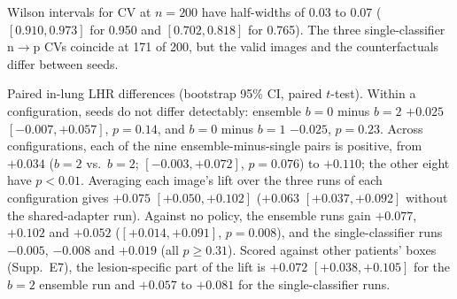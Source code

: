 \begin{table}[h]
\centering
\caption{PPO seed replicates on the default's 400 test images. CV with Wilson 95\% CI; transfer is the mean $\rho_v$ over the three validators; in-lung LHR with $t$-interval on the 148 annotated images. $^{\dagger}$LoRA also retrained (seed 1), one adapter for both directions; resumed training (Supp.~E5).}
\label{tab:suppl-seeds}
\scriptsize
\setlength{\tabcolsep}{2.2pt}
\end{table}

Wilson intervals for CV at $n=200$ have half-widths of 0.03 to 0.07 (\eg $[0.910, 0.973]$ for 0.950 and $[0.702, 0.818]$ for 0.765). The three single-classifier n$\to$p CVs coincide at 171 of 200, but the valid images and the counterfactuals differ between seeds.

Paired in-lung LHR differences (bootstrap 95\% CI, paired $t$-test). Within a configuration, seeds do not differ detectably: ensemble $b=0$ minus $b=2$ $+0.025$ $[-0.007, +0.057]$, $p=0.14$, and $b=0$ minus $b=1$ $-0.025$, $p=0.23$. Across configurations, each of the nine ensemble-minus-single pairs is positive, from $+0.034$ ($b=2$ vs.\ $b=2$; $[-0.003, +0.072]$, $p=0.076$) to $+0.110$; the other eight have $p<0.01$. Averaging each image's lift over the three runs of each configuration gives $+0.075$ $[+0.050, +0.102]$ ($+0.063$ $[+0.037, +0.092]$ without the shared-adapter run). Against no policy, the ensemble runs gain $+0.077$, $+0.102$ and $+0.052$ ($[+0.014, +0.091]$, $p=0.008$), and the single-classifier runs $-0.005$, $-0.008$ and $+0.019$ (all $p\geq0.31$). Scored against other patients' boxes (Supp.~E7), the lesion-specific part of the lift is $+0.072$ $[+0.038, +0.105]$ for the $b=2$ ensemble run and $+0.057$ to $+0.081$ for the single-classifier runs.

